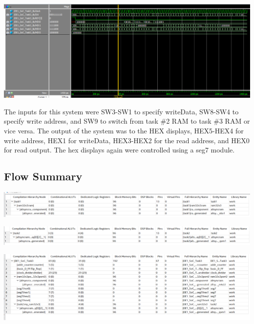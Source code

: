 \documentclass[11pt, titlepage]{article}
\begin{document}
            \begin{center}
                \includegraphics[scale = 0.5]{Images/task 3 DE1 testbench.png}
            \end{center}

            The inputs for this system were SW3-SW1 to specify writeData, SW8-SW4 to specify write address, and SW9 to switch from task \#2 RAM to task \#3 RAM or vice versa. The output of the system was to the HEX displays, HEX5-HEX4 for write address, HEX1 for writeData, HEX3-HEX2 for the read address, and HEX0 for read output. The hex displays again were controlled using a seg7 module. 

        \subsection{Flow Summary}
            \begin{center}
                \includegraphics[scale = 0.5]{Images/task1 resouces.png}
            \end{center}

            \begin{center}
                \includegraphics[scale = 0.5]{Images/task2 resouces.png}
            \end{center}

            \begin{center}
                \includegraphics[scale = 0.5]{Images/task 3 resoucres.png}
            \end{center}
\end{document}

